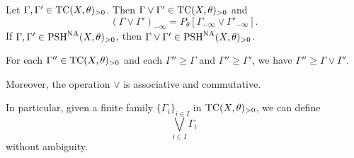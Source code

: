 \begin{corollary}\label{cor:testcurvlorprop}
    Let $\Gamma,\Gamma'\in \mathrm{TC}(X,\theta)_{>0}$. Then $\Gamma\lor \Gamma'\in\mathrm{TC}(X,\theta)_{>0}$ and
    \begin{equation}\label{eq:GammalorGammapminfty}
    (\Gamma\lor \Gamma')_{-\infty}=P_{\theta}\left[\Gamma_{-\infty}\lor \Gamma'_{-\infty}\right].
    \end{equation}
    If $\Gamma,\Gamma'\in \mathrm{PSH}^{\mathrm{NA}}(X,\theta)_{>0}$, then $\Gamma\lor \Gamma'\in\mathrm{PSH}^{\mathrm{NA}}(X,\theta)_{>0}$.

    For each $\Gamma''\in \mathrm{TC}(X,\theta)_{>0}$ and each $\Gamma''\geq \Gamma$ and $\Gamma''\geq \Gamma'$, we have $\Gamma''\geq \Gamma\lor \Gamma'$.

    Moreover, the operation $\lor$ is associative and commutative.
\end{corollary}
In particular, given a finite family $\{\Gamma_i\}_{i\in I}$ in $\mathrm{TC}(X,\theta)_{>0}$, we can define
\[
\bigvee_{i\in I}\Gamma_i
\]
without ambiguity.
